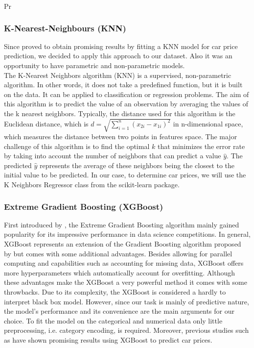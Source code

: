 \documentclass[12pt]{article}
\begin{document}
Pr\subsubsection{K-Nearest-Neighbours (KNN)}
Since \cite{Samruddhi2020} proved to obtain promising results by fitting a KNN model for car price prediction, we decided to apply this approach to our dataset. Also it was an opportunity to have parametric and non-parametric models. \\

\noindent The K-Nearest Neighbors algorithm (KNN) is a supervised, non-parametric algorithm. In other words, it does not take a predefined function, but it is built on the data. It can be applied to classification or regression problems. The aim of this algorithm is to predict the value of an observation by averaging the values of the k nearest neighbors. Typically, the distance used for this algorithm is the Euclidean distance, which is \( d = \sqrt{{\sum_{i=1}^{n} (x_{2i} - x_{1i})^2}} \) in n-dimensional space, which measures the distance between two points in features space. The major challenge of this algorithm is to find the optimal $k$ that minimizes the error rate by taking into account the number of neighbors that can predict a value $\hat{y}$. The predicted $\hat{y}$ represents the average of these neighbors being the closest to the initial value to be predicted. In our case, to determine car prices, we will use the K Neighbors Regressor class from the scikit-learn package. 

\subsubsection{Extreme Gradient Boosting (XGBoost)}
First introduced by \cite{Chen2016}, the Extreme Gradient Boosting algorithm mainly gained popularity for its impressive performance in data science competitions. In general, XGBoost represents an extension of the Gradient Boosting algorithm proposed by \cite{Friedman2001} but comes with some additional advantages. Besides allowing for parallel computing and capabilities such as accounting for missing data, XGBoost offers more hyperparameters which  automatically account for overfitting. Although these advantages make the XGBoost a very powerful method it comes with some throwbacks. Due to its complexity, the XGBoost is considered a hardly to interpret black box model. However, since our task is mainly of predictive nature, the model's performance and its convenience are the main arguments for our choice. To fit the model on the categorical and numerical data only little preprocessing, i.e. category encoding, is required. Moreover, previous studies such as \cite{Gajera2021} have shown promising results using XGBoost to predict car prices. \\
\end{document}
